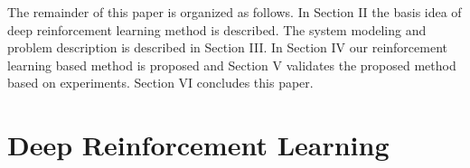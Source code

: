 \documentclass[letterpaper,10 pt,conference]{ieeeconf}
\begin{document}
The remainder of this paper is organized as follows. In Section II the basis idea of deep reinforcement learning method is described. The system modeling and problem description is described in Section III.  In Section IV our reinforcement learning based method is proposed and Section V validates the proposed method based on experiments. Section VI concludes this paper.

%
\section{Deep Reinforcement Learning}
\end{document}
